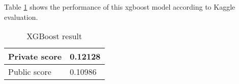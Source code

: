 Table \ref{tab:xgboost_result} shows the performance of this xgboost model according to Kaggle evaluation. 
\begin{table}[h]
	\centering
	\caption{XGBoost result}
	\label{tab:xgboost_result}
	\begin{tabular}{|m{100pt}|m{50pt}|}
		\hline
		Private score & 0.12128 \\ \hline
		Public score  & 0.10986 \\ \hline
	\end{tabular}
\end{table}	